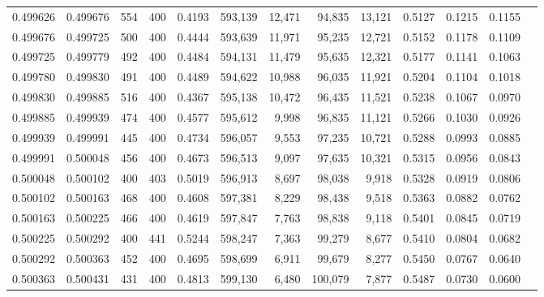 \begin{tabular}{rrrrrrrrrrrrr}
0.499626 & 0.499676 &    554 & 400 &                                     0.4193 & 593,139 &  12,471 &  94,835 &  13,121 & 0.5127 & 0.1215 & 0.1155 \\
0.499676 & 0.499725 &    500 & 400 &                                     0.4444 & 593,639 &  11,971 &  95,235 &  12,721 & 0.5152 & 0.1178 & 0.1109 \\
0.499725 & 0.499779 &    492 & 400 &                                     0.4484 & 594,131 &  11,479 &  95,635 &  12,321 & 0.5177 & 0.1141 & 0.1063 \\
0.499780 & 0.499830 &    491 & 400 &                                     0.4489 & 594,622 &  10,988 &  96,035 &  11,921 & 0.5204 & 0.1104 & 0.1018 \\
0.499830 & 0.499885 &    516 & 400 &                                     0.4367 & 595,138 &  10,472 &  96,435 &  11,521 & 0.5238 & 0.1067 & 0.0970 \\
0.499885 & 0.499939 &    474 & 400 &                                     0.4577 & 595,612 &   9,998 &  96,835 &  11,121 & 0.5266 & 0.1030 & 0.0926 \\
0.499939 & 0.499991 &    445 & 400 &                                     0.4734 & 596,057 &   9,553 &  97,235 &  10,721 & 0.5288 & 0.0993 & 0.0885 \\
0.499991 & 0.500048 &    456 & 400 &                                     0.4673 & 596,513 &   9,097 &  97,635 &  10,321 & 0.5315 & 0.0956 & 0.0843 \\
0.500048 & 0.500102 &    400 & 403 &                                     0.5019 & 596,913 &   8,697 &  98,038 &   9,918 & 0.5328 & 0.0919 & 0.0806 \\
0.500102 & 0.500163 &    468 & 400 &                                     0.4608 & 597,381 &   8,229 &  98,438 &   9,518 & 0.5363 & 0.0882 & 0.0762 \\
0.500163 & 0.500225 &    466 & 400 &                                     0.4619 & 597,847 &   7,763 &  98,838 &   9,118 & 0.5401 & 0.0845 & 0.0719 \\
0.500225 & 0.500292 &    400 & 441 &                                     0.5244 & 598,247 &   7,363 &  99,279 &   8,677 & 0.5410 & 0.0804 & 0.0682 \\
0.500292 & 0.500363 &    452 & 400 &                                     0.4695 & 598,699 &   6,911 &  99,679 &   8,277 & 0.5450 & 0.0767 & 0.0640 \\
0.500363 & 0.500431 &    431 & 400 &                                     0.4813 & 599,130 &   6,480 & 100,079 &   7,877 & 0.5487 & 0.0730 & 0.0600 \\

\end{tabular}
